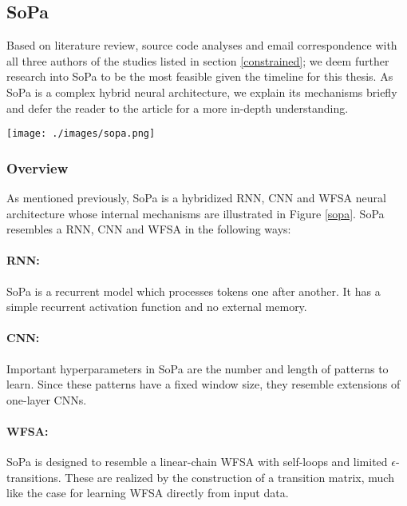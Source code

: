 \subsection{SoPa}

Based on literature review, source code analyses and email correspondence with all three authors of the studies listed in section \ref{constrained}; we deem further research into SoPa to be the most feasible given the timeline for this thesis. As SoPa is a complex hybrid neural architecture, we explain its mechanisms briefly and defer the reader to the article for a more in-depth understanding.

\begin{figure*}
  \centering 
  \texttt{[image: ./images/sopa.png]} 
  \caption{Schematic of the SoPa neural architecture \citep{schwartz2018sopa}}
  \label{sopa}
\end{figure*}

\subsubsection{Overview}

As mentioned previously, SoPa is a hybridized RNN, CNN and WFSA neural architecture whose internal mechanisms are illustrated in Figure \ref{sopa}. SoPa resembles a RNN, CNN and WFSA in the following ways:

\paragraph{RNN:} SoPa is a recurrent model which processes tokens one after another. It has a simple recurrent activation function and no external memory.

\paragraph{CNN:} Important hyperparameters in SoPa are the number and length of patterns to learn. Since these patterns have a fixed window size, they resemble extensions of one-layer CNNs.

\paragraph{WFSA:} SoPa is designed to resemble a linear-chain WFSA with self-loops and limited $\epsilon$-transitions. These are realized by the construction of a transition matrix, much like the case for learning WFSA directly from input data.

